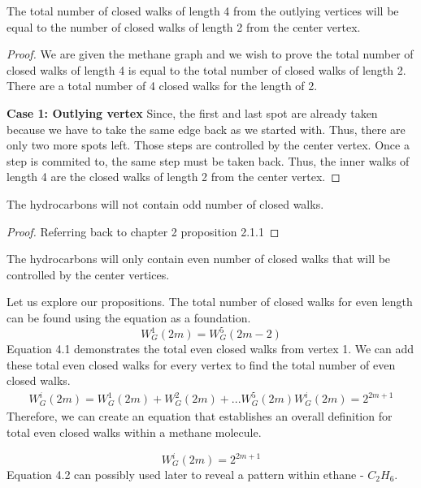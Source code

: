 \begin{proposition}
    The total number of closed walks of length 4 from the outlying vertices will be equal to the number of closed walks of length 2 from the center vertex.
\end{proposition}
\begin{proof}
    We are given the methane graph and we wish to prove the total number of closed walks of length 4 is equal to the total number of closed walks of length 2.  There are a total number of 4 closed walks for the length of 2.  \par \textbf{Case 1: Outlying vertex} Since, the first and last spot are already taken because we have to take the same edge back as we started with.  Thus, there are only two more spots left.  Those steps are controlled by the center vertex. Once a step is commited to, the same step must be taken back.  Thus, the inner walks of length 4 are the closed walks of length 2 from the center vertex. 
\end{proof}
\begin{theorem}
    The hydrocarbons will not contain odd number of closed walks.
\end{theorem}
\begin{proof}
    Referring back to chapter 2 proposition 2.1.1
\end{proof}
\begin{lemma}
    The hydrocarbons will only contain even number of closed walks that will be controlled by the center vertices. 
\end{lemma}
Let us explore our propositions. The total number of closed walks for even length can be found using the equation as a foundation. 
\begin{equation}
    W_{G}^1(2m)= W_G^5(2m-2)
\end{equation}
Equation 4.1 demonstrates the total even closed walks from vertex 1. We can add these total even closed walks for every vertex to find the total number of even closed walks.
\begin{align*}
    W_{G}^i(2m) = W_{G}^1(2m) + W_{G}^2(2m)+... W_{G}^5(2m)
    W_{G}^i(2m) = 2^{2m+1}
\end{align*}
Therefore, we can create an equation that establishes an overall definition for total even closed walks within a methane molecule.

\begin{equation}
    W_{G}^i(2m) = 2^{2m+1}
\end{equation}
Equation 4.2 can possibly used later to reveal a pattern within ethane - $C_2H_6$.

